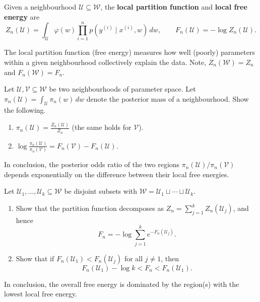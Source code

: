 \documentclass[11pt]{article}
\newcommand{\W}{\mathcal{W}}
\newcommand{\U}{\mathcal{U}}
\newcommand{\V}{\mathcal{V}}
\begin{document}
\begin{definition}
\label{def:local-free-energy}
    Given a neighbourhood $\U \subseteq \W$, the
    \textbf{local partition function} and \textbf{local free energy} are
    \begin{equation}
    \label{eq:local-free-energy}
        Z_n(\U) = \int_{\U} \varphi(w) \prod_{i=1}^{n} p(y^{(i)} \mid x^{(i)}, w)\, dw,
        \qquad
        F_n(\U) = -\log Z_n(\U).
    \end{equation}
\end{definition}

The local partition function (free energy) measures how well (poorly) parameters
within a given neighbourhood collectively explain the data.
Note, $Z_n(\W) = Z_n$ and $F_n(\W) = F_n$.

\begin{exercise}
    \label{ex:posterior-free-energy}
    Let $\U, \V \subseteq \W$ be two neighbourhoods of parameter space.
    Let $\pi_n(\U) = \int_{\U} \pi_n(w) \,dw$ denote the posterior mass of
    a neighbourhood. Show the following.
\begin{enumerate}
    \item $\displaystyle \pi_n(\U) = \frac{Z_n(\U)}{Z_n}$ (the same holds for $\V$).
    \item $\displaystyle \log \frac{\pi_n(\U)}{\pi_n(\V)} = F_n(\V) - F_n(\U)$.
\end{enumerate}
In conclusion, the posterior odds ratio of the two regions
    $\pi_n(\U) / \pi_n(\V)$
depends exponentially on the difference between their local free energies.
\end{exercise}

\begin{exercise}
    \label{ex:partition-decomposition}
    Let $\U_1, \ldots, \U_k \subseteq \W$ be disjoint subsets with
    $\W = \U_1 \sqcup \cdots \sqcup \U_k$.
\begin{enumerate}
    \item
        \label{ex:partition-decomposition:logsumexp}
        Show that the partition function decomposes as
        $Z_n = \sum_{j=1}^k Z_n(\U_j)$, and hence
        \begin{equation*}
            F_n
            = -\log \sum_{j=1}^k e^{-F_n(\U_j)}.
        \end{equation*}
    \item
        Show that if $F_n(\U_1) < F_n(\U_j)$ for all $j \neq 1$, then
        \begin{equation*}
            F_n(\U_1) - \log k < F_n < F_n(\U_1).
        \end{equation*}
\end{enumerate}
In conclusion, the overall free energy is dominated by the region(s) with the
lowest local free energy.
\end{exercise}
\end{document}
